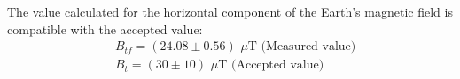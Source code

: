 The value calculated for the horizontal component of the Earth's magnetic field is compatible with the accepted value:
\begin{align*}
    &B_{tf}=(24.08\pm0.56)\,\, \mu\mathrm{T}\,\, \text{(Measured value)}\\
    &B_t=(30 \pm 10)\,\, \mu\mathrm{T}\,\, \text{(Accepted value)}\\
\end{align*}
    
    
